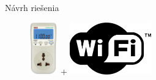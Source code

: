 \documentclass[hyperref={unicode}]{beamer}
\begin{document}
\begin{frame}{Návrh riešenia}
	\begin{figure}[htp]
		\centering
		\def \myGraphicsHeight {2.25cm}
		\includegraphics[align=c,height=\myGraphicsHeight]{digital-plug-meter}
		{\Huge +}
		\includegraphics[align=c,height=\myGraphicsHeight]{logo-wifi}

\end{figure}
\end{frame}
\end{document}
